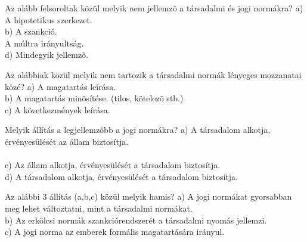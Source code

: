 \begin{frame}  

\begin{tcolorbox}[title={1. Kérdés}]
Az alább felsoroltak közül melyik nem jellemzõ a társadalmi és jogi normákra?
\tcblower
a) A hipotetikus szerkezet.\\
b) A szankció.\\
 A múltra irányultság.\\
d) Mindegyik jellemzõ.
\end{tcolorbox}

\begin{tcolorbox}[title={2. Kérdés}]
Az alábbiak közül melyik nem tartozik a társadalmi normák lényeges mozzanatai közé?
\tcblower
a) A magatartás leírása.\\
b) A magatartás minõsítése. (tilos, kötelezõ stb.)\\
c) A következmények leírása.\\
\end{tcolorbox}

\begin{tcolorbox}[title={3. Kérdés}]
Melyik állítás a legjellemzõbb a jogi normákra?
\tcblower
a) A társadalom alkotja, érvényesülését az állam biztosítja.\\
\\
c) Az állam alkotja, érvényesülését a társadalom biztosítja.\\
d) A társadalom alkotja, érvényesülését a társadalom biztosítja.
\end{tcolorbox}

\begin{tcolorbox}[title={4. Kérdés}]
Az alábbi 3 állítás (a,b,c) közül melyik hamis?
\tcblower
a) A jogi normákat gyorsabban meg lehet változtatni, mint a társadalmi normákat.\\
b) Az erkölcsi normák szankciórendszerét a társadalmi nyomás jellemzi.\\
c) A jogi norma az emberek formális magatartására irányul.\\
\end{tcolorbox}

\end{frame}


